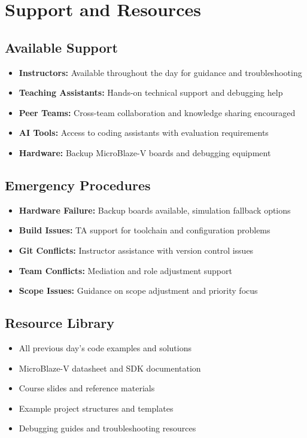 \documentclass[11pt,a4paper]{article}
\begin{document}
\section{Support and Resources}

\subsection{Available Support}
\begin{itemize}
    \item \textbf{Instructors:} Available throughout the day for guidance and troubleshooting
    \item \textbf{Teaching Assistants:} Hands-on technical support and debugging help
    \item \textbf{Peer Teams:} Cross-team collaboration and knowledge sharing encouraged
    \item \textbf{AI Tools:} Access to coding assistants with evaluation requirements
    \item \textbf{Hardware:} Backup MicroBlaze-V boards and debugging equipment
\end{itemize}

\subsection{Emergency Procedures}
\begin{itemize}
    \item \textbf{Hardware Failure:} Backup boards available, simulation fallback options
    \item \textbf{Build Issues:} TA support for toolchain and configuration problems
    \item \textbf{Git Conflicts:} Instructor assistance with version control issues
    \item \textbf{Team Conflicts:} Mediation and role adjustment support
    \item \textbf{Scope Issues:} Guidance on scope adjustment and priority focus
\end{itemize}

\subsection{Resource Library}
\begin{itemize}
    \item All previous day's code examples and solutions
    \item MicroBlaze-V datasheet and SDK documentation
    \item Course slides and reference materials
    \item Example project structures and templates
    \item Debugging guides and troubleshooting resources
\end{itemize}
\end{document}
